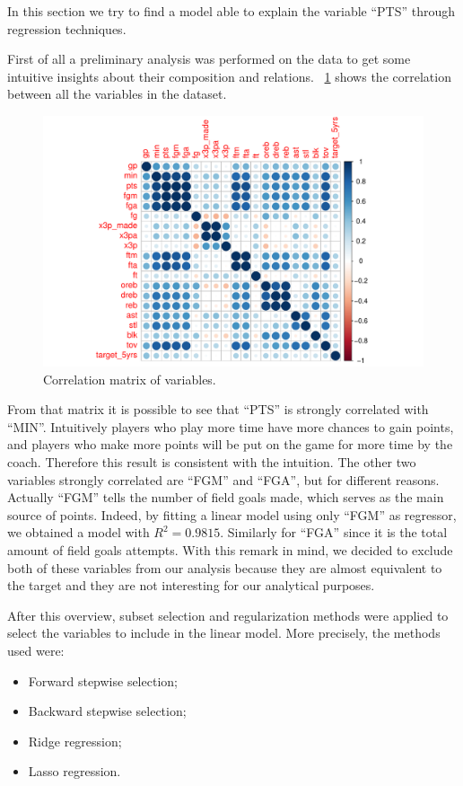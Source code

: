 In this section we try to find a model able to explain the variable ``PTS'' through regression techniques.

First of all a preliminary analysis was performed on the data to get some intuitive insights about their composition and relations.
\Fig~\ref{fig:CorrMatrix} shows the correlation between all the variables in the dataset.

\begin{figure}[h]
	\centering
	\includegraphics[width=0.7\linewidth]{ImageFiles/Regression/CorrMatrix.pdf}
	\caption{Correlation matrix of variables.}
	\label{fig:CorrMatrix}
\end{figure}

From that matrix it is possible to see that ``PTS'' is strongly correlated with ``MIN''. Intuitively players who play more time have more chances to gain points, and players who make more points will be put on the game for more time by the coach. Therefore this result is consistent with the intuition.
The other two variables strongly correlated are ``FGM'' and ``FGA'', but for different reasons. Actually ``FGM'' tells the number of field goals made, which serves as the main source of points. Indeed, by fitting a linear model using only ``FGM'' as regressor, we obtained a model with $R^2 = 0.9815$. Similarly for ``FGA'' since it is the total amount of field goals attempts. With this remark in mind, we decided to exclude both of these variables from our analysis because they are almost equivalent to the target and they are not interesting for our analytical purposes.

After this overview, subset selection and regularization methods were applied to select the variables to include in the linear model. More precisely, the methods used were:
\begin{itemize}
	\item Forward stepwise selection;
	\item Backward stepwise selection;
	\item Ridge regression;
	\item Lasso regression.
\end{itemize}
